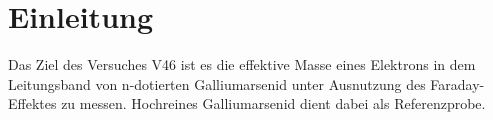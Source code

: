 \section{Einleitung}
\label{sec:einleitung}
Das Ziel des Versuches V46 ist es die effektive Masse eines Elektrons in dem Leitungsband von n-dotierten Galliumarsenid 
unter Ausnutzung des Faraday-Effektes zu messen. Hochreines Galliumarsenid dient dabei als Referenzprobe.